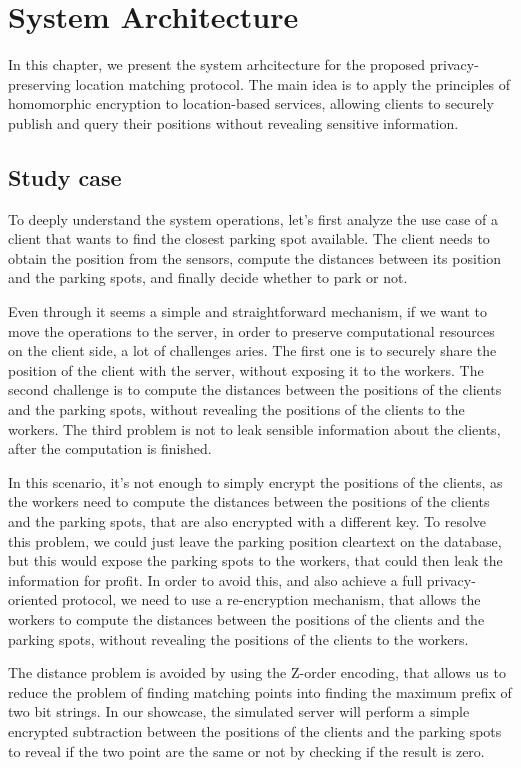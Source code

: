 \documentclass[12pt,a4paper,twoside]{book}
\begin{document}
\chapter{System Architecture}
In this chapter, we present the system arhcitecture for the proposed privacy-preserving location matching protocol. The main idea is to apply the principles of homomorphic encryption to location-based services, allowing clients to securely publish and query their positions without revealing sensitive information.

\section{Study case}
To deeply understand the system operations, let's first analyze the use case of a client that wants to find the closest parking spot available. The client needs to obtain the position from the sensors, compute the distances between its position and the parking spots, and finally decide whether to park or not.

Even through it seems a simple and straightforward mechanism, if we want to move the operations to the server, in order to preserve computational resources on the client side, a lot of challenges aries. The first one is to securely share the position of the client with the server, without exposing it to the workers. The second challenge is to compute the distances between the positions of the clients and the parking spots, without revealing the positions of the clients to the workers. The third problem is not to leak sensible information about the clients, after the computation is finished.

In this scenario, it's not enough to simply encrypt the positions of the clients, as the workers need to compute the distances between the positions of the clients and the parking spots, that are also encrypted with a different key. To resolve this problem, we could just leave the parking position cleartext on the database, but this would expose the parking spots to the workers, that could then leak the information for profit. In order to avoid this, and also achieve a full privacy-oriented protocol, we need to use a re-encryption mechanism, that allows the workers to compute the distances between the positions of the clients and the parking spots, without revealing the positions of the clients to the workers.

The distance problem is avoided by using the Z-order encoding, that allows us to reduce the problem of finding matching points into finding the maximum prefix of two bit strings. In our showcase, the simulated server will perform a simple encrypted subtraction between the positions of the clients and the parking spots to reveal if the two point are the same or not by checking if the result is zero. 
\end{document}
